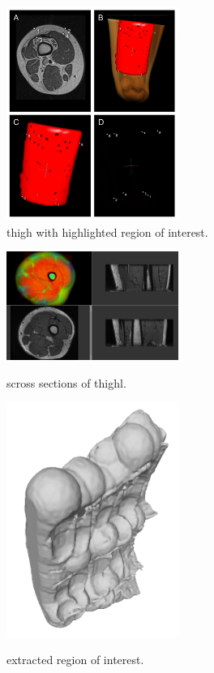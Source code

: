 \documentclass[letterpaper, 12 pt, conference]{ieeeconf}  %
\begin{document}
\begin{figure}[h!]
  \caption{thigh with highlighted region of interest.}
  \centering
    \includegraphics[width=0.5\textwidth]{images/thighwROI.jpg}
    
    \label{fig:thighwROI}
\end{figure}

\begin{figure}[h!]
  \caption{scross sections of thighl.}
  \centering
    \includegraphics[width=0.5\textwidth]{images/thigh_colored.png}
    \label{fig:thigh_colored}
\end{figure}

\begin{figure}[h!]
  \caption{extracted region of interest.}
  \centering
    \includegraphics[width=0.5\textwidth]{images/snapshot_angled02.png}
    \label{fig:angled}
\end{figure}
\end{document}
